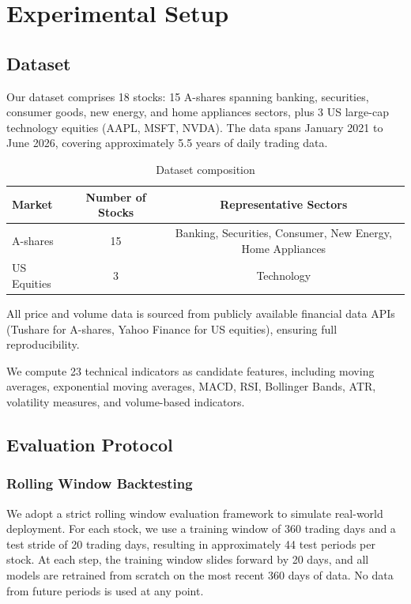 \documentclass[review]{elsarticle}
\begin{document}
\section{Experimental Setup}

\subsection{Dataset}

Our dataset comprises 18 stocks: 15 A-shares spanning banking, securities, consumer goods, new energy, and home appliances sectors, plus 3 US large-cap technology equities (AAPL, MSFT, NVDA). The data spans January 2021 to June 2026, covering approximately 5.5 years of daily trading data.

\begin{table}[t]
\centering
\caption{Dataset composition}
\label{tab:dataset}
\begin{tabular}{lcc}
\toprule
Market & Number of Stocks & Representative Sectors \\
\midrule
A-shares & 15 & Banking, Securities, Consumer, New Energy, Home Appliances \\
US Equities & 3 & Technology \\
\bottomrule
\end{tabular}
\end{table}

All price and volume data is sourced from publicly available financial data APIs (Tushare for A-shares, Yahoo Finance for US equities), ensuring full reproducibility.

We compute 23 technical indicators as candidate features, including moving averages, exponential moving averages, MACD, RSI, Bollinger Bands, ATR, volatility measures, and volume-based indicators.

\subsection{Evaluation Protocol}

\subsubsection{Rolling Window Backtesting}

We adopt a strict rolling window evaluation framework to simulate real-world deployment. For each stock, we use a training window of 360 trading days and a test stride of 20 trading days, resulting in approximately 44 test periods per stock. At each step, the training window slides forward by 20 days, and all models are retrained from scratch on the most recent 360 days of data. No data from future periods is used at any point.
\end{document}
